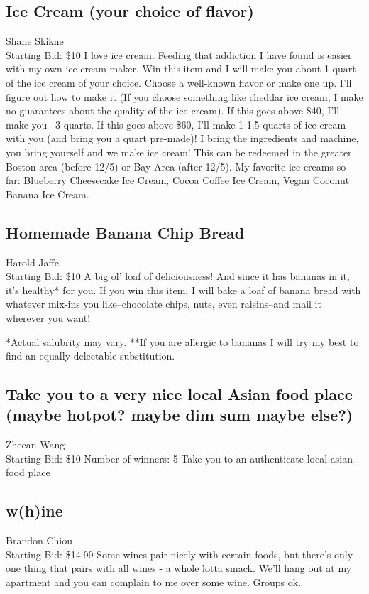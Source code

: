 \documentclass[11pt]{article}
\begin{document}
\subsection{Ice Cream (your choice of flavor)}
Shane Skikne
\\
Starting Bid: \$10
\newline
I love ice cream. Feeding that addiction I have found is easier with my own ice cream maker. Win this item and I will make you about 1 quart of the ice cream of your choice. Choose a well-known flavor or make one up. I'll figure out how to make it (If you choose something like cheddar ice cream, I make no guarantees about the quality of the ice cream). If this goes above \$40, I'll make you ~3 quarts. If this goes above \$60, I'll make 1-1.5 quarts of ice cream with you (and bring you a quart pre-made)! I bring the ingredients and machine, you bring yourself and we make ice cream! This can be redeemed in the greater Boston area (before 12/5) or Bay Area (after 12/5). My favorite ice creams so far: Blueberry Cheesecake Ice Cream, Cocoa Coffee Ice Cream, Vegan Coconut Banana Ice Cream.
\subsection{Homemade Banana Chip Bread}
Harold Jaffe
\\
Starting Bid: \$10
\newline
A big ol' loaf of deliciousness! And since it has bananas in it, it's healthy* for you. If you win this item, I will bake a loaf of banana bread with whatever mix-ins you like--chocolate chips, nuts, even raisins--and mail it wherever you want!

*Actual salubrity may vary.
**If you are allergic to bananas I will try my best to find an equally delectable substitution.
\subsection{Take you to a very nice local Asian food place (maybe hotpot? maybe dim sum maybe else?)}
Zhecan Wang
\\
Starting Bid: \$10
\newline
Number of winners: 5
\newline
Take you to an authenticate local asian food place
\subsection{w(h)ine}
Brandon Chiou
\\
Starting Bid: \$14.99
\newline
Some wines pair nicely with certain foods, but there's only one thing that pairs with all wines - a whole lotta smack. We'll hang out at my apartment and you can complain to me over some wine. Groups ok.
\end{document}
